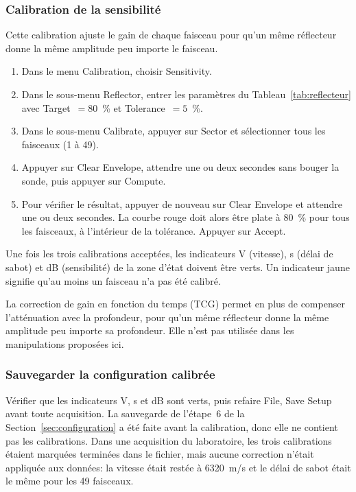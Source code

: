 \documentclass[11pt,letterpaper]{article}
\begin{document}
\subsubsection*{Calibration de la sensibilit\'e}

Cette calibration ajuste le gain de chaque faisceau pour qu'un m\^eme r\'eflecteur donne la m\^eme amplitude peu importe le faisceau.

\begin{enumerate}
  \item Dans le menu Calibration, choisir Sensitivity.
  \item Dans le sous-menu Reflector, entrer les param\`etres du Tableau~\ref{tab:reflecteur} avec Target~$= 80$~\% et Tolerance~$= 5$~\%.
  \item Dans le sous-menu Calibrate, appuyer sur Sector et s\'electionner tous les faisceaux (1 \`a 49).
  \item Appuyer sur Clear Envelope, attendre une ou deux secondes sans bouger la sonde, puis appuyer sur Compute.
  \item Pour v\'erifier le r\'esultat, appuyer de nouveau sur Clear Envelope et attendre une ou deux secondes. La courbe rouge doit alors \^etre plate \`a 80~\% pour tous les faisceaux, \`a l'int\'erieur de la tol\'erance. Appuyer sur Accept.
\end{enumerate}

Une fois les trois calibrations accept\'ees, les indicateurs V (vitesse), \textmu s (d\'elai de sabot) et dB (sensibilit\'e) de la zone d'\'etat doivent \^etre verts. Un indicateur jaune signifie qu'au moins un faisceau n'a pas \'et\'e calibr\'e.

La correction de gain en fonction du temps (TCG) permet en plus de compenser l'att\'enuation avec la profondeur, pour qu'un m\^eme r\'eflecteur donne la m\^eme amplitude peu importe sa profondeur. Elle n'est pas utilis\'ee dans les manipulations propos\'ees ici.

\subsubsection*{Sauvegarder la configuration calibr\'ee}

V\'erifier que les indicateurs V, \textmu s et dB sont verts, puis refaire File, Save Setup avant toute acquisition. La sauvegarde de l'\'etape~6 de la Section~\ref{sec:configuration} a \'et\'e faite avant la calibration, donc elle ne contient pas les calibrations. Dans une acquisition du laboratoire, les trois calibrations \'etaient marqu\'ees termin\'ees dans le fichier, mais aucune correction n'\'etait appliqu\'ee aux donn\'ees: la vitesse \'etait rest\'ee \`a 6320~m/s et le d\'elai de sabot \'etait le m\^eme pour les 49 faisceaux.
\end{document}
